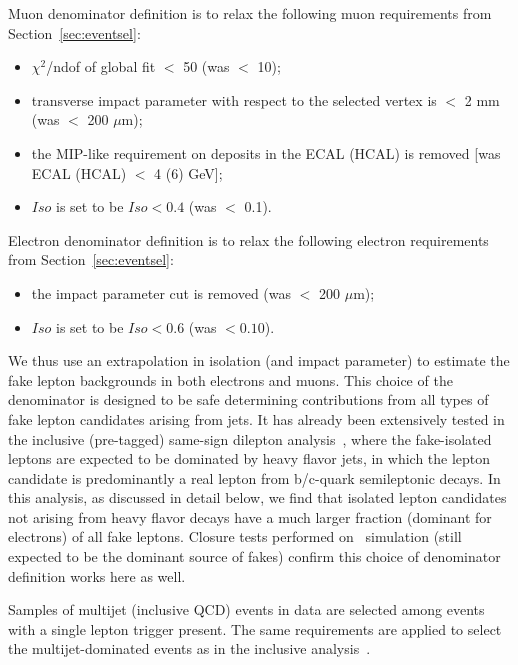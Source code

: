 Muon denominator definition is to relax the following muon requirements from
Section~\ref{sec:eventsel}:
\begin{itemize}
\item $\chi^2$/ndof of global fit $<$ 50 (was $<$ 10);
\item transverse impact parameter with respect to the selected vertex is
$<$ 2 mm (was $<$ 200 $\mu$m);
\item the MIP-like requirement on deposits in the ECAL (HCAL) is removed [was ECAL (HCAL) $<$ 4 (6) GeV];
\item $Iso$ is set to be $Iso < 0.4$  (was $<$ 0.1).
\end{itemize}

Electron denominator definition is to relax the following electron requirements from
Section~\ref{sec:eventsel}:
\begin{itemize}
\item the impact parameter cut is removed (was $<$ 200 $\mu$m);
\item $Iso$ is set to be $Iso < 0.6$ (was $<0.10$).
\end{itemize}

We thus use an extrapolation  in isolation (and impact parameter) to estimate the fake lepton backgrounds 
in both electrons and muons.
This choice of the denominator is designed to be safe determining contributions
from all types of fake lepton candidates arising from jets.
It has already been extensively tested in the inclusive (pre-tagged) same-sign dilepton analysis~\cite{ssnote2011},
where the fake-isolated leptons are expected to be dominated by
heavy flavor jets, in which the lepton candidate is predominantly a real lepton from b/c-quark semileptonic decays.
In this analysis, as discussed in detail below, we find that isolated lepton candidates
not arising from heavy flavor decays have a much larger fraction (dominant for electrons) of all fake leptons.
Closure tests performed on \ttbar\ simulation (still expected to be the dominant source of fakes)
confirm this choice of denominator definition works here as well.

Samples of multijet (inclusive QCD) events in data are selected among events with a single lepton trigger present.
The same requirements are applied to select the multijet-dominated events as in the inclusive analysis~\cite{ssnote2011}.

